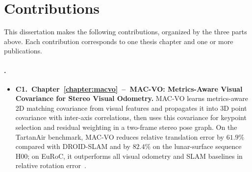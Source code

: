 \section{Contributions}
\label{sec:contributions}

This dissertation makes the following contributions, organized by the three parts above.
Each contribution corresponds to one thesis chapter and one or more publications.

\paragraph{\partITitle.}
\begin{itemize}
    \item \textbf{C1.~Chapter~\ref{chapter:macvo}~--~MAC-VO: Metrics-Aware Visual Covariance for Stereo Visual Odometry.}
    MAC-VO learns metrics-aware 2D matching covariance from visual features and propagates it into 3D point covariance with inter-axis correlations, then uses this covariance for keypoint selection and residual weighting in a two-frame stereo pose graph.
    On the TartanAir benchmark, MAC-VO reduces relative translation error by $61.9\%$ compared with DROID-SLAM and by $82.4\%$ on the lunar-surface sequence H00; on EuRoC, it outperforms all visual odometry and SLAM baselines in relative rotation error~\cite{qiu2025mac}.
\end{itemize}


